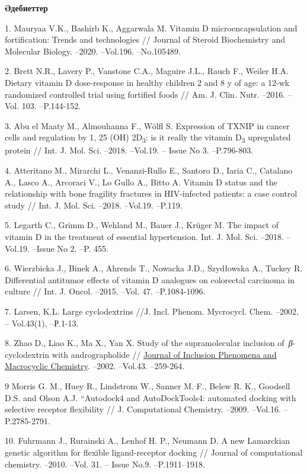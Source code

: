 {\bfseries Әдебиеттер}

1. Mauryaa V.K., Bashirb K., Aggarwala M. Vitamin D microencapsulation
and fortification: Trends and technologies // Journal of Steroid
Biochemistry and Molecular Biology. --2020. --Vol.196. --No.105489.

2. Brett N.R., Lavery P., Vanstone C.A., Maguire J.L., Rauch F., Weiler
H.A. Dietary vitamin D dose-response in healthy children 2 and 8 y of
age: a 12-wk randomized controlled trial using fortified foods // Am. J.
Clin. Nutr. --2016. -- Vol. 103. --P.144-152.

3. Abu el Maaty M., Almouhanna F., Wölfl S. Expression of TXNIP in
cancer cells and regulation by 1, 25 (OH) 2D\textsubscript{3}: is it
really the vitamin D\textsubscript{3} upregulated protein // Int. J.
Mol. Sci. --2018. --Vol.19. -- Issue No 3. --P.796-803.

4. Atteritano M., Mirarchi L., Venanzi-Rullo E., Santoro D., Iaria C.,
Catalano A., Lasco A., Arcoraci V., Lo Gullo A., Bitto A. Vitamin D
status and the relationship with bone fragility fractures in
HIV-infected patients: a case control study // Int. J. Mol. Sci. --2018.
--Vol.19. --P.119.

5. Legarth C., Grimm D., Wehland M., Bauer J., Krüger M. The impact of
vitamin D in the treatment of essential hypertension. Int. J. Mol. Sci.
--2018. --Vol.19. --Issue No 2. --P. 455.

6. Wierzbicka J., Binek A., Ahrends T., Nowacka J.D., Szydłowska A.,
Tuckey R. Differential antitumor effects of vitamin D analogues on
colorectal carcinoma in culture // Int. J. Oncol. --2015. --Vol. 47.
--P.1084-1096.

7. Larsen, K.L. Large cyclodextrins //J. Incl. Phenom. Mycrocycl. Chem.
--2002, -- Vol.43(1), --Р.1-13.

8. Zhao D., Liao K., Ma X., Yan X. Study of the supramolecular inclusion
of~\emph{β}-cyclodextrin with andrographolide //
\href{https://link.springer.com/journal/10847}{Journal of Inclusion
Phenomena and Macrocyclic Chemistry}. --2002. --Vol.43. --259-264.

9 Morris G. M., Huey R., Lindstrom W., Sanner M. F., Belew R. K.,
Goodsell D.S. and Olson A.J. ``Autodock4 and AutoDockTools4: automated
docking with selective receptor flexibility // J. Computational
Chemistry. --2009. --Vol.16. --P.2785-2791.

10. Fuhrmann J., Rurainski A., Lenhof H. P., Neumann D. A new Lamarckian
genetic algorithm for flexible ligand-receptor docking // Journal of
computational chemistry. --2010. --Vol. 31. -- Issue No.9.
--P.1911--1918.

